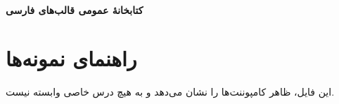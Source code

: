 \documentclass[12pt,a4paper]{article}
\begin{document}
\begin{center}{\Large\bfseries\color{HWNavy}کتابخانهٔ عمومی قالب‌های فارسی}\end{center}
\section*{راهنمای نمونه‌ها}
این فایل، ظاهر کامپوننت‌ها را نشان می‌دهد و به هیچ درس خاصی وابسته نیست.



\end{document}
